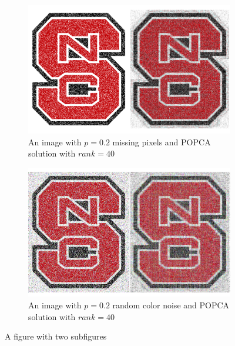 \documentclass[12pt]{article}
\begin{document}
	\begin{figure}[!htbp]
		\centering
		
		\begin{subfigure}{.45\textwidth}
			\centering
			\includegraphics[width=\linewidth]{Missing}
			\caption{An image with $p = 0.2$ missing pixels and POPCA solution with $rank = 40$}
			\label{fig:missing}
		\end{subfigure}%
		\hfill
		\begin{subfigure}{.45\textwidth}
			\centering
			\includegraphics[width=\linewidth]{Color}
			\caption{An image with $p = 0.2$ random color noise and POPCA solution with $rank = 40$}
			\label{fig:color}
		\end{subfigure}
		
		\caption{A figure with two subfigures}
		\label{fig:badge}
	\end{figure}
	
\end{document}

